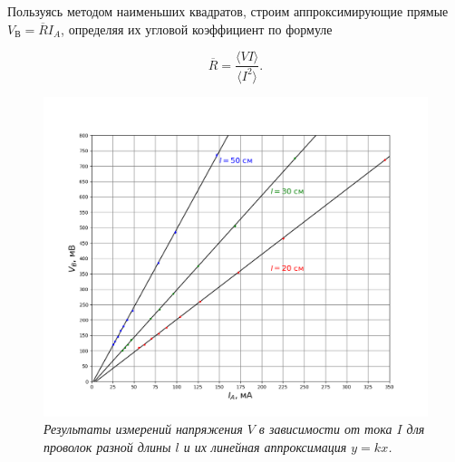 \documentclass[a4paper,12pt]{article} %
\begin{document}
Пользуясь методом наименьших квадратов, строим аппроксимирующие прямые $ V_\text{В} = \overline{R}I_A $, определяя их угловой коэффициент по формуле

\begin{equation}
\overline{R} = \frac{\langle VI \rangle}{\langle I^2 \rangle}.
\end{equation}

\begin{figure}[h!]
	\includegraphics[width=1\linewidth]{graph.png}
	\caption{\textit{Результаты измерений напряжения $ V $ в зависимости от тока $ I $ для проволок разной длины $ l $ и их линейная аппроксимация $ y=kx $.}}
	\label{graph}
\end{figure}
\end{document}

